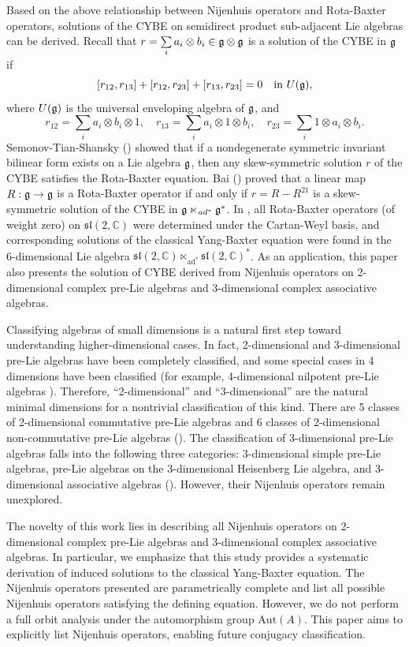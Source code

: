 \documentclass[12pt, reqno]{amsart}
\theoremstyle{plain}
\def \sl {\mathfrak{sl}}
\DeclareMathOperator \ad { {\mathrm{ad}} }
\begin{document}
Based on the above relationship between Nijenhuis operators and Rota-Baxter operators, solutions of the CYBE on semidirect product sub-adjacent Lie algebras can be derived. Recall that $r=\sum\limits_i a_i\otimes b_i\in {\frak g}\otimes {\frak g}$ is a solution of the CYBE in $\frak g$ if  
$$
[r_{12},r_{13}] + [r_{12},r_{23}] + [r_{13},r_{23}] = 0 \quad \text{in } U({\frak g}),
$$  
where $U({\frak g})$ is the universal enveloping algebra of ${\frak g}$, and  
$$
r_{12} = \sum\limits_i a_i\otimes b_i\otimes 1, \quad r_{13} = \sum\limits_i a_i\otimes 1\otimes b_i, \quad r_{23} = \sum\limits_i 1\otimes a_i\otimes b_i.
$$  
Semonov-Tian-Shansky (\cite{Semonov-Tian-Shansky}) showed that if a nondegenerate symmetric invariant bilinear form exists on a Lie algebra $\frak g$, then any skew-symmetric solution $r$ of the CYBE satisfies the Rota-Baxter equation. Bai (\cite{Bai}) proved that a linear map $R: \frak g \rightarrow \frak g$ is a Rota-Baxter operator if and only if $r = R - R^{21}$ is a skew-symmetric solution of the CYBE in $\mathfrak{g} \ltimes_{{\rm ad}^{\ast}} \frak g^{\ast}$. In \cite{Pei}, all Rota-Baxter operators (of weight zero) on $\sl(2,\mathbb{C})$ were determined under the Cartan-Weyl basis, and corresponding solutions of the classical Yang-Baxter equation were found in the 6-dimensional Lie algebra $\sl(2,\mathbb{C})\ltimes_{\ad^*}\sl(2,\mathbb{C})^*$. As an application, this paper also presents the solution of CYBE derived from Nijenhuis operators on 2-dimensional complex pre-Lie algebras and 3-dimensional complex associative algebras.

Classifying algebras of small dimensions is a natural first step toward understanding higher-dimensional cases. In fact, 2-dimensional and 3-dimensional pre-Lie algebras have been completely classified, and some special cases in 4 dimensions have been classified (for example, 4-dimensional nilpotent pre-Lie algebras \cite{Adashev}). Therefore, ``2-dimensional'' and ``3-dimensional'' are the natural minimal dimensions for a nontrivial classification of this kind.  There are 5 classes of 2-dimensional commutative pre-Lie algebras and 6 classes of 2-dimensional non-commutative pre-Lie algebras (\cite{Burde}). The classification of 3-dimensional pre-Lie algebras falls into the following three categories: 3-dimensional simple pre-Lie algebras, pre-Lie algebras on the 3-dimensional Heisenberg Lie algebra, and 3-dimensional associative algebras (\cite{Bai-1}). However, their Nijenhuis operators remain unexplored. 

The novelty of this work lies in describing all Nijenhuis operators on 2-dimensional complex pre-Lie algebras and 3-dimensional complex associative algebras. In particular, we emphasize that this study provides a systematic derivation of induced solutions to the classical Yang-Baxter equation. The Nijenhuis operators presented are parametrically complete and list all possible Nijenhuis operators satisfying the defining equation. However, we do not perform a full orbit analysis under the automorphism group $\mathrm{Aut}(A)$. This paper aims to explicitly list Nijenhuis operators, enabling future conjugacy classification.
\end{document}
